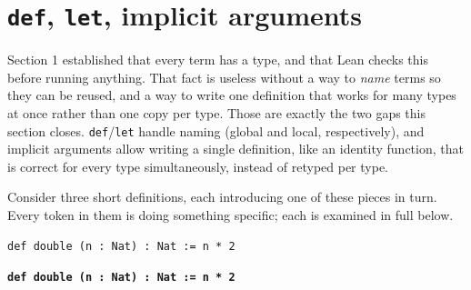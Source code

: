 \section{\texorpdfstring{\texttt{def}, \texttt{let}, implicit arguments}{def, let, implicit arguments}}\label{sec:01-basics:02-def-let-implicit:1}

Section 1 established that every term has a type, and that Lean checks this before running anything. That fact is useless without a way to \emph{name} terms so they can be reused, and a way to write one definition that works for many types at once rather than one copy per type. Those are exactly the two gaps this section closes. \texttt{def}/\texttt{let} handle naming (global and local, respectively), and implicit arguments allow writing a single definition, like an identity function, that is correct for every type simultaneously, instead of retyped per type.

Consider three short definitions, each introducing one of these pieces in turn. Every token in them is doing something specific; each is examined in full below.

\begin{lstlisting}
def double (n : Nat) : Nat := n * 2
\end{lstlisting}

\textbf{\texttt{def double (n : Nat) : Nat := n * 2}}

